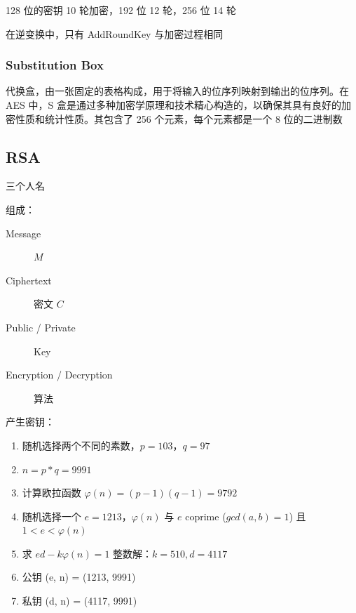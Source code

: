 \documentclass[11pt,journal,compsoc]{IEEEtran}
\begin{document}
128 位的密钥 10 轮加密，192 位 12 轮，256 位 14 轮

在逆变换中，只有 AddRoundKey 与加密过程相同


\subsubsection{Substitution Box}

代换盒，由一张固定的表格构成，用于将输入的位序列映射到输出的位序列。在 AES 中，S 盒是通过多种加密学原理和技术精心构造的，以确保其具有良好的加密性质和统计性质。其包含了 256 个元素，每个元素都是一个 8 位的二进制数


\subsection{RSA}

三个人名

组成：

\begin{description}
    \item[Message] $M$

    \item[Ciphertext] 密文 $C$

    \item[Public / Private] Key

    \item[Encryption / Decryption] 算法
\end{description}

产生密钥：

\begin{enumerate}
    \item 随机选择两个不同的素数，$p = 103$，$q = 97$

    \item $n = p * q = 9991$

    \item 计算欧拉函数 $\varphi(n) = (p - 1)(q - 1) = 9792$

    \item 随机选择一个 $e = 1213$，$\varphi(n)$ 与 $e$ coprime ($gcd(a, b) = 1$) 且 $1 < e < \varphi(n)$

    \item 求 $ed - k\varphi(n) = 1$ 整数解：$k = 510, d = 4117$

    \item 公钥 (e, n) = (1213, 9991)
    
    \item 私钥 (d, n) = (4117, 9991)
\end{enumerate}
\end{document}
